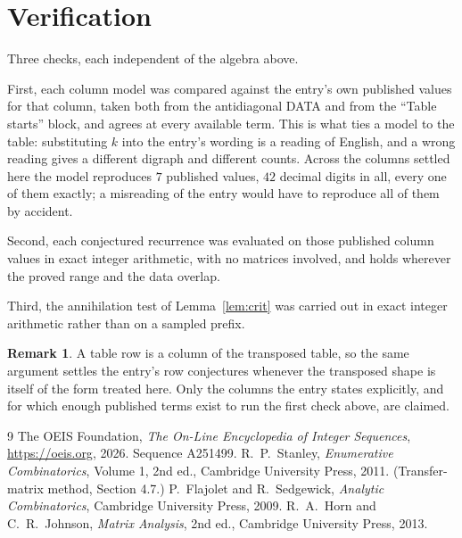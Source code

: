 \documentclass[11pt,a4paper]{article}
\theoremstyle{plain}
\theoremstyle{definition}
\newtheorem{remark}[theorem]{Remark}
\begin{document}
\section{Verification}

Three checks, each independent of the algebra above.

First, each column model was compared against the entry's own published values for that
column, taken both from the antidiagonal DATA and from the ``Table starts'' block, and agrees
at every available term. This is what ties a model to the table: substituting $k$ into the
entry's wording is a reading of English, and a wrong reading gives a different digraph and
different counts. Across the columns settled here the model reproduces $7$ published
values, $42$ decimal digits in all, every one of them exactly; a misreading of the entry
would have to reproduce all of them by accident.

Second, each conjectured recurrence was evaluated on those published column values in exact
integer arithmetic, with no matrices involved, and holds wherever the proved range and the
data overlap.

Third, the annihilation test of Lemma~\ref{lem:crit} was carried out in exact integer
arithmetic rather than on a sampled prefix.

\begin{remark}
A table row is a column of the transposed table, so the same argument settles the entry's row
conjectures whenever the transposed shape is itself of the form treated here. Only the columns
the entry states explicitly, and for which enough published terms exist to run the first check
above, are claimed.
\end{remark}

\begin{thebibliography}{9}
 The OEIS Foundation, \emph{The On-Line Encyclopedia of Integer
Sequences}, \url{https://oeis.org}, 2026. Sequence A251499.
 R.~P.~Stanley, \emph{Enumerative Combinatorics}, Volume 1, 2nd ed.,
Cambridge University Press, 2011. (Transfer-matrix method, Section 4.7.)
 P.~Flajolet and R.~Sedgewick, \emph{Analytic Combinatorics}, Cambridge
University Press, 2009.
 R.~A.~Horn and C.~R.~Johnson, \emph{Matrix Analysis}, 2nd ed., Cambridge
University Press, 2013.
\end{thebibliography}
\end{document}
